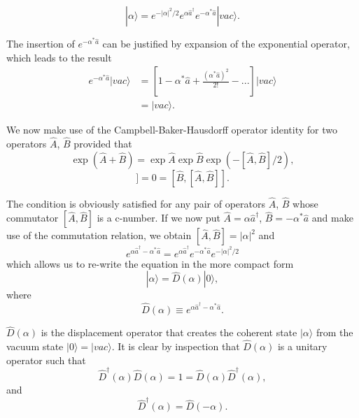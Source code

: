     


\begin{equation} |\alpha\rangle=e^{-|\alpha|^{2}/2}e^{\alpha\hat{a}^{\dagger}}e^{-\alpha^{*}\hat{a}}|vac\rangle. \end{equation}



The insertion of $e^{-\alpha^{*}\hat{a}}$ can be justified by expansion of the exponential operator, which leads to the result
\begin{align*}
e^{-\alpha^{*}\hat{a}}|vac\rangle &= \left[1-\alpha^{*}\hat{a}+\frac{(\alpha^{*}\hat{a})^{2}}{2!}-...\right]|vac\rangle \\
&= |vac\rangle.
\end{align*}

We now make use of the Campbell-Baker-Hausdorff operator identity for two operators $\hat{A}$, $\hat{B}$ provided that
\begin{equation*} \exp(\hat{A}+\hat{B})=\exp\hat{A}\exp\hat{B}\exp(-[\hat{A},\hat{B}]/2), \end{equation*}
\begin{equation*} [\hat{A},[\hat{A},\hat{B}]]=0=[\hat{B},[\hat{A},\hat{B}]]. \end{equation*}

The condition is obviously satisfied for any pair of operators $\hat{A}$, $\hat{B}$ whose commutator $[\hat{A}, \hat{B}]$ is a c-number. If we now put $\hat{A}=\alpha\hat{a}^{\dagger}$, $\hat{B}=-\alpha^{*}\hat{a}$ and make use of the commutation relation, we obtain $[\hat{A},\hat{B}]=|\alpha|^{2}$ and
\begin{equation*} e^{\alpha\hat{a}^{\dagger}-\alpha^{*}\hat{a}}=e^{\alpha\hat{a}^{\dagger}}e^{-\alpha^{*}\hat{a}}e^{-|\alpha|^{2}/2} \end{equation*}
which allows us to re-write the equation in the more compact form
\begin{equation} |\alpha\rangle=\hat{D}(\alpha)|0\rangle \label{eq:displacementoperator}, \end{equation}
where
\begin{equation*} \hat{D}(\alpha)\equiv e^{\alpha\hat{a}^{\dagger}-\alpha^{*}\hat{a}}. \end{equation*}

$\hat{D}(\alpha)$ is the displacement operator that creates the coherent state $|\alpha\rangle$ from the vacuum state $|0\rangle=|vac\rangle$. It is clear by inspection that $\hat{D}(\alpha)$ is a unitary operator such that
\begin{equation*} \hat{D}^{\dagger}(\alpha)\hat{D}(\alpha)=1=\hat{D}(\alpha)\hat{D}^{\dagger}(\alpha), \end{equation*}
and
\begin{equation*} \hat{D}^{\dagger}(\alpha)=\hat{D}(-\alpha). \end{equation*}


